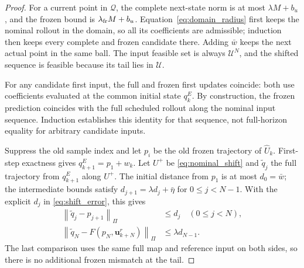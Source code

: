 \documentclass[journal]{IEEEtran}
\newcommand{\vu}{\mathbf{u}}
\newcommand{\norm}[1]{\left\lVert #1\right\rVert}
\begin{document}
\begin{proof}
For a current point in $\mathcal Q$, the complete next-state norm is at most $\lambda M+b_u$, and the frozen bound is $\lambda_{\rm fr}M+b_u$. Equation~\eqref{eq:domain_radius} first keeps the nominal rollout in the domain, so all its coefficients are admissible; induction then keeps every complete and frozen candidate there. Adding $\bar w$ keeps the next actual point in the same ball. The input feasible set is always $\mathcal U^N$, and the shifted sequence is feasible because its tail lies in $\mathcal U$.

For any candidate first input, the full and frozen first updates coincide: both use coefficients evaluated at the common initial state $q_k^E$. By construction, the frozen prediction coincides with the full scheduled rollout along the nominal input sequence. Induction establishes this identity for that sequence, not full-horizon equality for arbitrary candidate inputs.

Suppress the old sample index and let $p_i$ be the old frozen trajectory of $\widehat U_k$. First-step exactness gives $q_{k+1}^E=p_1+w_k$. Let $U^+$ be \eqref{eq:nominal_shift} and $\widetilde q_j$ the full trajectory from $q_{k+1}^E$ along $U^+$. The initial distance from $p_1$ is at most $d_0=\bar w$; the intermediate bounds satisfy $d_{j+1}=\lambda d_j+\bar\eta$ for $0\le j<N-1$. With the explicit $d_j$ in \eqref{eq:shift_error}, this gives
\begin{equation}
\begin{split}
\norm{\widetilde q_j-p_{j+1}}_\Pi&\le d_j\quad(0\le j<N),\\
\norm{\widetilde q_N-F(p_N,\vu_{k+N}^r)}_\Pi
&\le\lambda d_{N-1}.
\end{split}
\label{eq:shift_comparison}
\end{equation}
The last comparison uses the same full map and reference input on both sides, so there is no additional frozen mismatch at the tail.


\end{proof}
\end{document}
